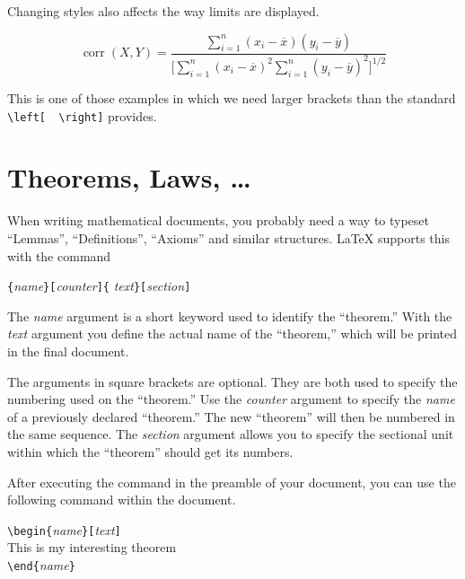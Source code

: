 Changing styles also affects the way limits are displayed.
\begin{example}
\begin{displaymath}
\mathop{\mathrm{corr}}(X,Y)= 
 \frac{\displaystyle 
   \sum_{i=1}^n(x_i-\overline x)
   (y_i-\overline y)} 
  {\displaystyle\biggl[
 \sum_{i=1}^n(x_i-\overline x)^2
\sum_{i=1}^n(y_i-\overline y)^2
\biggr]^{1/2}}
\end{displaymath}    
\end{example}

\noindent This is one of those examples in which we need larger
brackets than the standard \verb|\left[  \right]| provides.


\section{Theorems, Laws, \ldots}

When writing mathematical documents, you probably need a way to
typeset ``Lemmas'', ``Definitions'', ``Axioms'' and similar
structures. \LaTeX{} supports this with the command
\begin{lscommand}
\verb|{|\emph{name}\verb|}[|\emph{counter}\verb|]{|%
         \emph{text}\verb|}[|\emph{section}\verb|]|
\end{lscommand}
The \emph{name} argument is a short keyword used to identify the
``theorem.'' With the \emph{text} argument you define the actual name
of the ``theorem,'' which will be printed in the final document.

The arguments in square brackets are optional. They are both used to
specify the numbering used on the ``theorem.'' Use  the \emph{counter}
argument to specify the \emph{name} of a previously declared
``theorem.'' The new ``theorem'' will then be numbered in the same
sequence.  The \emph{section} argument allows you to specify the
sectional unit within which the ``theorem'' should get its numbers.

After executing the  command in the preamble of your
document, you can use the following command within the document.
\begin{code}
\verb|\begin{|\emph{name}\verb|}[|\emph{text}\verb|]|\\
This is my interesting theorem\\
\verb|\end{|\emph{name}\verb|}|     
\end{code}

